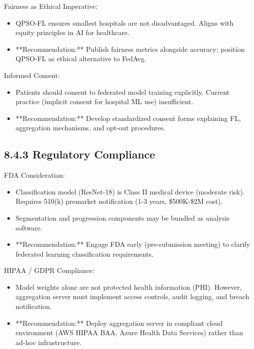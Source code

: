 Fairness as Ethical Imperative:

\begin{itemize}
  \item QPSO-FL ensures smallest hospitals are not disadvantaged. Aligns with equity principles in AI for healthcare.
  \item **Recommendation:** Publish fairness metrics alongside accuracy; position QPSO-FL as ethical alternative to FedAvg.
\end{itemize}

Informed Consent:

\begin{itemize}
  \item Patients should consent to federated model training explicitly. Current practice (implicit consent for hospital ML use) insufficient.
  \item **Recommendation:** Develop standardized consent forms explaining FL, aggregation mechanisms, and opt-out procedures.
\end{itemize}


\subsection{8.4.3 Regulatory Compliance}
FDA Consideration:

\begin{itemize}
  \item Classification model (ResNet-18) is Class II medical device (moderate risk). Requires 510(k) premarket notification (1-3 years, \$500K-\$2M cost).
  \item Segmentation and progression components may be bundled as analysis software.
  \item **Recommendation:** Engage FDA early (pre-submission meeting) to clarify federated learning classification requirements.
\end{itemize}

HIPAA / GDPR Compliance:

\begin{itemize}
  \item Model weights alone are not protected health information (PHI). However, aggregation server must implement access controls, audit logging, and breach notification.
  \item **Recommendation:** Deploy aggregation server in compliant cloud environment (AWS HIPAA BAA, Azure Health Data Services) rather than ad-hoc infrastructure.
\end{itemize}


